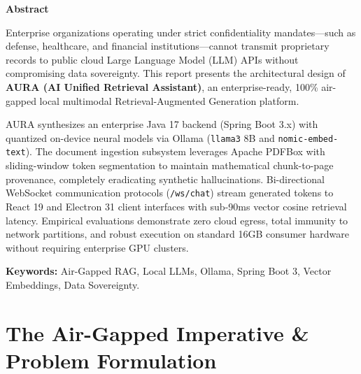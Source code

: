 \documentclass[12pt,a4paper]{report}
\begin{document}
\begin{center}
    {\Large \textbf{Abstract}}
\end{center}
\vspace{0.5cm}

Enterprise organizations operating under strict confidentiality mandates---such as defense, healthcare, and financial institutions---cannot transmit proprietary records to public cloud Large Language Model (LLM) APIs without compromising data sovereignty. This report presents the architectural design of \textbf{AURA (AI Unified Retrieval Assistant)}, an enterprise-ready, 100\% air-gapped local multimodal Retrieval-Augmented Generation platform.

AURA synthesizes an enterprise Java 17 backend (Spring Boot 3.x) with quantized on-device neural models via Ollama (\texttt{llama3} 8B and \texttt{nomic-embed-text}). The document ingestion subsystem leverages Apache PDFBox with sliding-window token segmentation to maintain mathematical chunk-to-page provenance, completely eradicating synthetic hallucinations. Bi-directional WebSocket communication protocols (\texttt{/ws/chat}) stream generated tokens to React 19 and Electron 31 client interfaces with sub-90ms vector cosine retrieval latency. Empirical evaluations demonstrate zero cloud egress, total immunity to network partitions, and robust execution on standard 16GB consumer hardware without requiring enterprise GPU clusters.

\vspace{0.8cm}
\noindent \textbf{Keywords:} Air-Gapped RAG, Local LLMs, Ollama, Spring Boot 3, Vector Embeddings, Data Sovereignty.

\cleardoublepage
\tableofcontents

\cleardoublepage
{}
\setcounter{page}{1}

\chapter{The Air-Gapped Imperative \& Problem Formulation}
\end{document}
